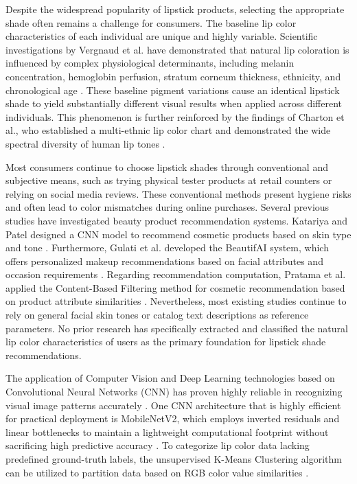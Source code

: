 \documentclass[10pt,a4paper]{article}
\begin{document}
Despite the widespread popularity of lipstick products, selecting the appropriate shade often remains a challenge for consumers. The baseline lip color characteristics of each individual are unique and highly variable. Scientific investigations by Vergnaud et al. have demonstrated that natural lip coloration is influenced by complex physiological determinants, including melanin concentration, hemoglobin perfusion, stratum corneum thickness, ethnicity, and chronological age \cite{vergnaud2024lip, vergnaud2023measurement}. These baseline pigment variations cause an identical lipstick shade to yield substantially different visual results when applied across different individuals. This phenomenon is further reinforced by the findings of Charton et al., who established a multi-ethnic lip color chart and demonstrated the wide spectral diversity of human lip tones \cite{charton2026development}.

Most consumers continue to choose lipstick shades through conventional and subjective means, such as trying physical tester products at retail counters or relying on social media reviews. These conventional methods present hygiene risks and often lead to color mismatches during online purchases. Several previous studies have investigated beauty product recommendation systems. Katariya and Patel designed a CNN model to recommend cosmetic products based on skin type and tone \cite{katariya2025novel}. Furthermore, Gulati et al. developed the BeautifAI system, which offers personalized makeup recommendations based on facial attributes and occasion requirements \cite{gulati2023beautifai}. Regarding recommendation computation, Pratama et al. applied the Content-Based Filtering method for cosmetic recommendation based on product attribute similarities \cite{pratama2025sistem}. Nevertheless, most existing studies continue to rely on general facial skin tones or catalog text descriptions as reference parameters. No prior research has specifically extracted and classified the natural lip color characteristics of users as the primary foundation for lipstick shade recommendations.

The application of Computer Vision and Deep Learning technologies based on Convolutional Neural Networks (CNN) has proven highly reliable in recognizing visual image patterns accurately \cite{szeliski2022computer, goodfellow2016deep, lecun2015deep}. One CNN architecture that is highly efficient for practical deployment is MobileNetV2, which employs inverted residuals and linear bottlenecks to maintain a lightweight computational footprint without sacrificing high predictive accuracy \cite{sandler2018mobilenetv2, howard2017mobilenets}. To categorize lip color data lacking predefined ground-truth labels, the unsupervised K-Means Clustering algorithm can be utilized to partition data based on RGB color value similarities \cite{macqueen1967methods, pedregosa2011scikit}.
\end{document}
